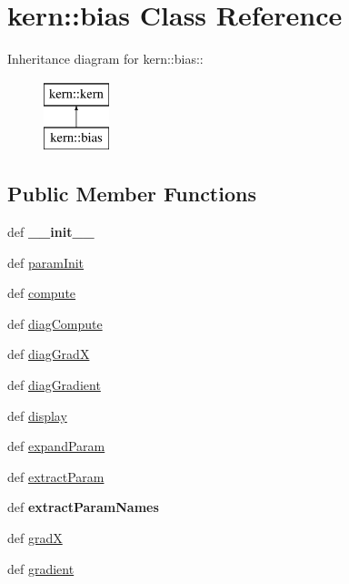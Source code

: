 \hypertarget{classkern_1_1bias}{
\section{kern::bias Class Reference}
\label{classkern_1_1bias}
}
Inheritance diagram for kern::bias::\begin{figure}[H]
\begin{center}
\leavevmode
\includegraphics[height=2cm]{classkern_1_1bias}
\end{center}
\end{figure}
\subsection*{Public Member Functions}
\begin{CompactItemize}
\item 
\hypertarget{classkern_1_1bias_0019fb71ede6f8d6d8a4e4738c8e7565}{
def \textbf{\_\-\_\-init\_\-\_\-}}
\label{classkern_1_1bias_0019fb71ede6f8d6d8a4e4738c8e7565}

\item 
def \hyperlink{classkern_1_1bias_39576d2e5f8f5fa8ffab2de6597bb295}{paramInit}
\item 
def \hyperlink{classkern_1_1bias_eac30cc736065001ecadc1d5053a9170}{compute}
\item 
def \hyperlink{classkern_1_1bias_9cb634c409600f556ee51e1205986859}{diagCompute}
\item 
def \hyperlink{classkern_1_1bias_ccc65546498307dfbc396d3612b826fe}{diagGradX}
\item 
def \hyperlink{classkern_1_1bias_06a7443d3cdcb0c7b433b452cb84f357}{diagGradient}
\item 
def \hyperlink{classkern_1_1bias_c1b8e81b9b0942aa0dbe393f8069f0d6}{display}
\item 
def \hyperlink{classkern_1_1bias_9a869f2def84ada0aee7698139c31ea2}{expandParam}
\item 
def \hyperlink{classkern_1_1bias_f9b0c3a62a227ad4480e501e3ebb10f4}{extractParam}
\item 
\hypertarget{classkern_1_1bias_6a387587db971d0ca177d86fdd274717}{
def \textbf{extractParamNames}}
\label{classkern_1_1bias_6a387587db971d0ca177d86fdd274717}

\item 
def \hyperlink{classkern_1_1bias_f27d4ed48a7df56e86609c27dd1ab430}{gradX}
\item 
def \hyperlink{classkern_1_1bias_7a982606235bcbcee2cbd4b1d1cabef7}{gradient}
\end{CompactItemize}
